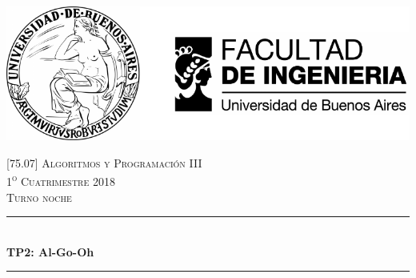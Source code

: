 

\pagestyle{fancy}
\begin{titlepage}
	\newcommand{\HRule}{\rule{\linewidth}{0.5mm}} %
	\center %
	
	\thispagestyle{empty}
	\begin{center}
		\includegraphics[scale=1]{includes/banner_fiuba.pdf}\\
	\end{center}

	
	\textsc{\LARGE \textsc{[75.07] Algoritmos y Programación III}}
	\\[0.5cm]
	\textsc{\large 1\textsuperscript{o} Cuatrimestre 2018}
	\\[0.5cm]
	\textsc{\large Turno noche}
	\\[0.5cm]
	
	\HRule
	\\[0.5cm]
	{\huge\bfseries TP2: Al-Go-Oh}
	\\[0.2cm]
	\HRule
	\\[0.5cm]
	

\end{titlepage}
